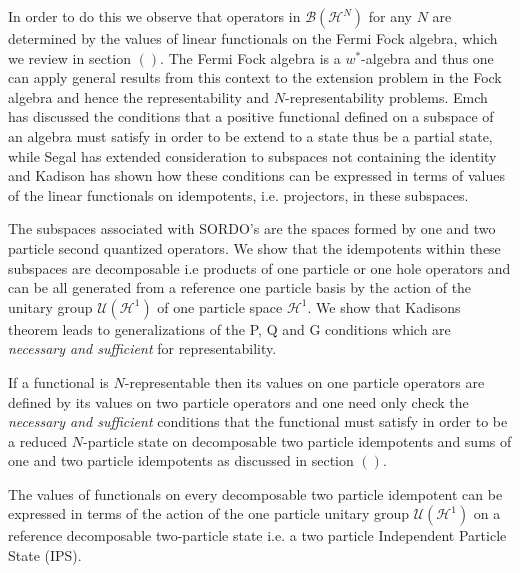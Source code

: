 \documentclass[aps,preprint]{revtex4}%
\begin{document}
In order to do this we observe that operators in $\mathcal{B}\left(
\mathcal{H}^{N}\right)  $ for any $N$ are determined by the values of linear
functionals on the Fermi Fock algebra, which we review in section $\left(
{}\right)  .$ The Fermi Fock algebra is a $w^{\ast}$-algebra and thus one can
apply general results from this context to the extension problem in the Fock
algebra and hence the representability and $N$-representability problems. Emch
has discussed the conditions that a positive functional defined on a subspace
of an algebra must satisfy in order to be extend to a state thus be a partial
state, while Segal has extended consideration to subspaces not containing the
identity and Kadison has shown how these conditions can be expressed in terms
of values of the linear functionals on idempotents, i.e. projectors, in these subspaces.

The subspaces associated with SORDO's are the spaces formed by one and two
particle second quantized operators. We show that the idempotents within these
subspaces are decomposable i.e products of one particle or one hole operators
and can be all generated from a reference one particle basis by the action of
the unitary group $\mathcal{U}\left(  \mathcal{H}^{1}\right)  $ of one
particle space $\mathcal{H}^{1}.$ We show that Kadisons theorem leads to
generalizations of the P, Q and G conditions which are \emph{necessary and
sufficient }for\emph{ }representability.

If a functional is $N$-representable then its values on one particle operators
are defined by its values on two particle operators and one need only check
the \emph{necessary and sufficient} conditions that the functional must
satisfy in order to be a reduced $N$-particle state on decomposable two
particle idempotents and sums of one and two particle idempotents as discussed
in section $\left(  {}\right)  $.

The values of functionals on every decomposable two particle idempotent can be
expressed in terms of the action of the one particle unitary group
$\mathcal{U}\left(  \mathcal{H}^{1}\right)  $ on a reference decomposable
two-particle state i.e. a two particle Independent Particle State (IPS).
\end{document}
